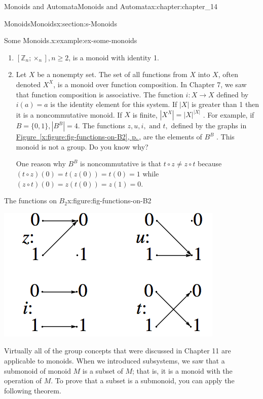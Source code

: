 \documentclass[twoside,10pt,]{book}
\newcommand{\xreffont}{\relax}
\numberwithin{equation}{section}
\begin{document}
\begin{chapterptx}{Monoids and Automata}{}{Monoids and Automata}{}{}{x:chapter:chapter_14}
\begin{sectionptx}{Monoids}{}{Monoids}{}{}{x:section:s-Monoids}
\begin{example}{Some Monoids.}{x:example:ex-some-monoids}
\begin{enumerate}[label=(\alph*)]
\item{}\(\left[\mathbb{Z}_n;\times_n\right],n\geqslant 2\), is a monoid with identity 1.%
\item{}Let \(X\) be a nonempty set. The set of all functions from \(X\) into \(X\), often denoted \(X^X\), is a monoid over function composition. In Chapter 7, we saw that function composition is associative. The function \(i:X\to X\) defined by \(i(a)=a\) is the identity element for this system. If \(\lvert X\rvert\) is greater than 1 then it is a noncommutative monoid. If \(X\) is finite, \(\left\lvert X^X\right\rvert =\lvert X\rvert ^{\lvert X\rvert }\) . For example, if \(B=\{0,1\}, \left\lvert B^B\right\rvert=4\). The functions \(z,u,i,\textrm{ and } t,\) defined by the graphs in \hyperref[x:figure:fig-functions-on-B2]{Figure~{\xreffont\ref{x:figure:fig-functions-on-B2}}, p.\,\pageref{x:figure:fig-functions-on-B2}}, are the elements of \(B^B\) . This monoid is not a group. Do you know why?%
\par
One reason why \(B^B\) is noncommutative is that \(t \circ z \neq z \circ t\) because \((t\circ z)(0)=t(z(0))=t(0)=1\) while \((z\circ t)(0)=z(t(0))=z(1)=0\).%
\end{enumerate}
%
\end{example}
\begin{figureptx}{The functions on \(B_2\)}{x:figure:fig-functions-on-B2}{}%
\begin{image}{0.15}{0.7}{0.15}%
\includegraphics[width=\linewidth]{images/fig-functions-on-B2.png}
\end{image}%
\tcblower
\end{figureptx}%
Virtually all of the group concepts that were discussed in Chapter 11 are applicable to monoids. When we introduced subsystems, we saw that a submonoid of monoid \(M\) is a subset of \(M\); that is, it is a monoid with the operation of \(M\). To prove that a subset is a submonoid, you can apply the following theorem.%

\end{sectionptx}
\end{chapterptx}
\end{document}
